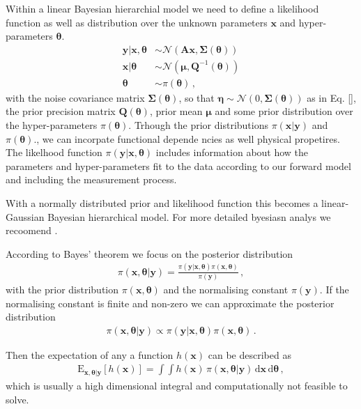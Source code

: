 Within a linear Bayesian hierarchial model we need to define a likelihood function as well as distribution over the unknown parameters $\bm{x}$ and hyper-parameters $\bm{\theta}$.
\begin{subequations}
	\begin{align}
		\bm{y}|\bm{x}, \bm{\theta}&\sim \mathcal{N}(\bm{A} \bm{x}, \bm{\Sigma}(\bm{\theta})) \label{eq:likelihood}  \\
		\bm{x}| \bm{\theta} & \sim  \mathcal{N}( \bm{\mu}, \bm{Q}^{-1}(\bm{\theta})  ) \label{eq:xPrior} \\
		\bm{\theta} &\sim  \pi(\bm{\theta}) \label{eq:gammaPrior}\, ,
	\end{align}
	\label{eq:BayMode}
\end{subequations}
with the noise covariance matrix $\bm{\Sigma}(\bm{\theta})$, so that $\bm{\eta}  \sim \mathcal{N}(0, \bm{\Sigma}(\bm{\theta})) $ as in Eq. \ref{}, the prior precision matrix $\bm{Q}(\bm{\theta})$, prior mean $\bm{\mu}$
and some prior distribution over the hyper-parameters $\pi(\bm{\theta})$.
Trhough the prior distributions  $\pi(\bm{x}|\bm{y})$ and $\pi(\bm{\theta})$., we can incorpate functional depende ncies as well physical propetires.
The likelhood function $\pi(\bm{y}|\bm{x}, \bm{\theta})$ includes information about how the parameters and hyper-parameters fit to the data according to our forward model and including the measurement process.

With a normally distributed prior and likelihood function this becomes a linear-Gaussian Bayesian hierarchical model.
For more detailed byesiasn analys we recoomend \cite{}.

According to Bayes' theorem we focus on the posterior distribution
\begin{align}
	\pi(\bm{x},\bm{\theta}|\bm{y}) = \frac{ \pi(\bm{y} | \bm{x}, \bm{\theta} ) \pi(\bm{x}, \bm{\theta})}{\pi(\bm{y})} \, ,
\end{align}
with the prior distribution $\pi(\bm{x}, \bm{\theta})$ and the normalising constant $\pi(\bm{y})$.
If the normalising constant is finite and non-zero we can approximate the posterior distribution
\begin{align}
	\pi(\bm{x},\bm{\theta}|\bm{y}) \propto \pi(\bm{y} | \bm{x}, \bm{\theta} ) \pi(\bm{x}, \bm{\theta}) \, .
\end{align}

Then the expectation of any a function $h(\bm{x})$ can be described as 
\begin{align}
	\text{E}_{\bm{x},\bm{\theta}|\bm{y}} [h(\bm{x})] =  \int \int   h(\bm{x}) \,  \pi(\bm{x}, \bm{\theta} | \bm{y} ) \, \text{d} \bm{x}  \, \text{d} \bm{\theta}   \label{eq:expPos} \, ,
\end{align}
which is usually a high dimensional integral and computationally not feasible to solve.

